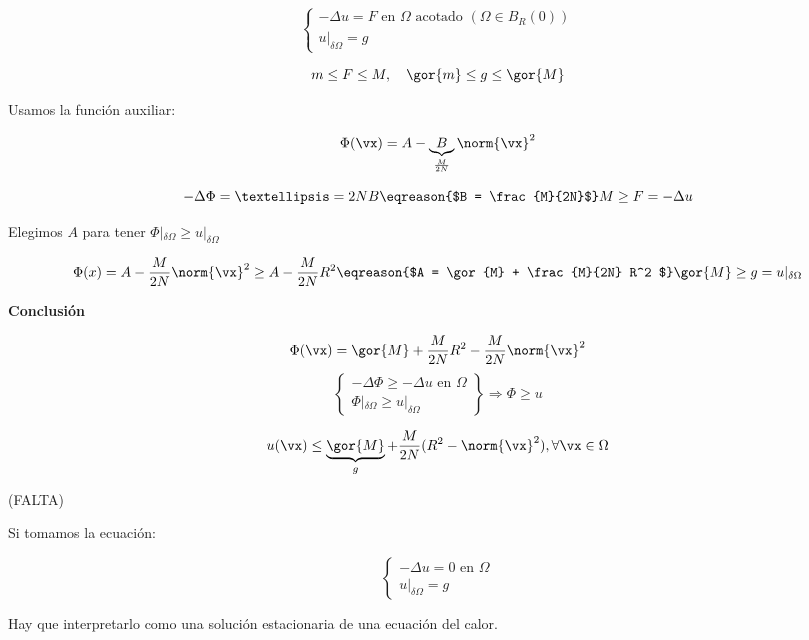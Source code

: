 	\begin{example}


		\[\begin{cases}
		-\Delta u  = F \text{ en } \Omega \text{ acotado } (\Omega \in B_R(0)) \\
		u|_{\delta \Omega} = g
		\end{cases}\]

		\[ m \leq F \leq M, \quad \gor{m} \leq g \leq \gor{M} \]

		Usamos la función auxiliar:

		\[ \Phi(\vx) = A - \underbrace{B}_{\frac{M}{2N}} \norm{\vx}^2 \]

		\[ - \Delta \Phi = … = 2NB \eqreason{$B = \frac{M}{2N}$} M \geq F = -\Delta u  \]

		Elegimos $A$ para tener $\Phi|_{\delta \Omega} \geq u |_{\delta\Omega}$

		\[ \Phi(x) = A - \frac{M}{2N} \norm{\vx}^2 \geq A - \frac{M}{2N} R^2 \eqreason{$A = \gor{M} + \frac{M}{2N} R^2 $} \gor{M} \geq g = u|_{\delta \Omega} \]

		\textbf{Conclusión}

		\[ \Phi(\vx) = \gor{M} + \frac{M}{2N} R^2 - \frac{M}{2N} \norm{\vx}^2 \]
		\[ \left\{ \begin{array}{l}
		-\Delta \Phi \geq - \Delta u \text{ en } \Omega \\
		\Phi |_{\delta \Omega} \geq u|_{\delta \Omega}

		\end{array} \right\} \Rightarrow \Phi \geq u \]

		\[ u(\vx) \leq \underbrace{\gor{M}}_{g} + \frac{M}{2N} (R^2 - \norm{\vx}^2), \forall \vx \in \Omega \]

	\end{example}

	\begin{example}

		(FALTA)

	\end{example}

	\obs Si tomamos la ecuación:

	\[ \begin{cases}
		-\Delta u = 0 \text{ en } \Omega \\
		u|_{\delta \Omega} = g
	\end{cases}\]

	Hay que interpretarlo como una solución estacionaria de una ecuación del calor.

